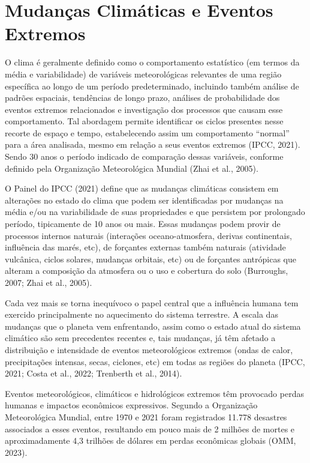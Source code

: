 \documentclass[12pt,a4paper,oneside]{book}
\begin{document}
\section{Mudanças Climáticas e Eventos Extremos}

O clima é geralmente definido como o comportamento estatístico (em termos da média e variabilidade) de variáveis meteorológicas relevantes de uma região específica ao longo de um período predeterminado, incluindo também análise de padrões espaciais, tendências de longo prazo, análises de probabilidade dos eventos extremos relacionados e investigação dos processos que causam esse comportamento. Tal abordagem permite identificar os ciclos presentes nesse recorte de espaço e tempo, estabelecendo assim um comportamento ``normal'' para a área analisada, mesmo em relação a seus eventos extremos (IPCC, 2021). Sendo 30 anos o período indicado de comparação dessas variáveis, conforme definido pela Organização Meteorológica Mundial (Zhai et al., 2005).

O Painel do IPCC (2021) define que as mudanças climáticas consistem em alterações no estado do clima que podem ser identificadas por mudanças na média e/ou na variabilidade de suas propriedades e que persistem por prolongado período, tipicamente de 10 anos ou mais. Essas mudanças podem provir de processos internos naturais (interações oceano-atmosfera, derivas continentais, influência das marés, etc), de forçantes externas também naturais (atividade vulcânica, ciclos solares, mudanças orbitais, etc) ou de forçantes antrópicas que alteram a composição da atmosfera ou o uso e cobertura do solo (Burroughs, 2007; Zhai et al., 2005).

Cada vez mais se torna inequívoco o papel central que a influência humana tem exercido principalmente no aquecimento do sistema terrestre. A escala das mudanças que o planeta vem enfrentando, assim como o estado atual do sistema climático são sem precedentes recentes e, tais mudanças, já têm afetado a distribuição e intensidade de eventos meteorológicos extremos (ondas de calor, precipitações intensas, secas, ciclones, etc) em todas as regiões do planeta (IPCC, 2021; Costa et al., 2022; Trenberth et al., 2014).

Eventos meteorológicos, climáticos e hidrológicos extremos têm provocado perdas humanas e impactos econômicos expressivos. Segundo a Organização Meteorológica Mundial, entre 1970 e 2021 foram registrados 11.778 desastres associados a esses eventos, resultando em pouco mais de 2 milhões de mortes e aproximadamente 4,3 trilhões de dólares em perdas econômicas globais (OMM, 2023).
\end{document}
